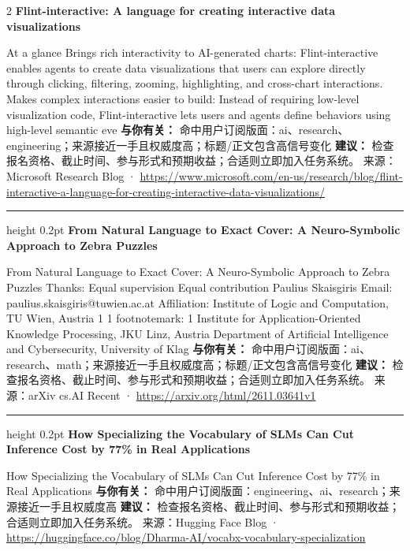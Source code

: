 \documentclass[10.5pt]{ctexart}
\begin{document}
\begin{multicols}{2}
{\large\bfseries Flint-interactive: A language for creating interactive data visualizations}\par
At a glance Brings rich interactivity to AI-generated charts: Flint-interactive enables agents to create data visualizations that users can explore directly through clicking, filtering, zooming, highlighting, and cross-chart interactions. Makes complex interactions easier to build: Instead of requiring low-level visualization code, Flint-interactive lets users and agents define behaviors using high-level semantic eve
\textbf{与你有关：} 命中用户订阅版面：ai、research、engineering；来源接近一手且权威度高；标题/正文包含高信号变化
\textbf{建议：} 检查报名资格、截止时间、参与形式和预期收益；合适则立即加入任务系统。
{\footnotesize\color{ormuted} 来源：Microsoft Research Blog · \url{https://www.microsoft.com/en-us/research/blog/flint-interactive-a-language-for-creating-interactive-data-visualizations/}}
\vspace{2mm}
\hrule height 0.2pt
\vspace{2mm}
{\large\bfseries From Natural Language to Exact Cover: A Neuro-Symbolic Approach to Zebra Puzzles}\par
From Natural Language to Exact Cover: A Neuro-Symbolic Approach to Zebra Puzzles Thanks: Equal supervision Equal contribution Paulius Skaisgiris Email: paulius.skaisgiris@tuwien.ac.at Affiliation: Institute of Logic and Computation, TU Wien, Austria 1 1 footnotemark: 1 Institute for Application-Oriented Knowledge Processing, JKU Linz, Austria Department of Artificial Intelligence and Cybersecurity, University of Klag
\textbf{与你有关：} 命中用户订阅版面：ai、research、math；来源接近一手且权威度高；标题/正文包含高信号变化
\textbf{建议：} 检查报名资格、截止时间、参与形式和预期收益；合适则立即加入任务系统。
{\footnotesize\color{ormuted} 来源：arXiv cs.AI Recent · \url{https://arxiv.org/html/2611.03641v1}}
\vspace{2mm}
\hrule height 0.2pt
\vspace{2mm}
{\large\bfseries How Specializing the Vocabulary of SLMs Can Cut Inference Cost by 77\% in Real Applications}\par
How Specializing the Vocabulary of SLMs Can Cut Inference Cost by 77\% in Real Applications
\textbf{与你有关：} 命中用户订阅版面：engineering、ai、research；来源接近一手且权威度高
\textbf{建议：} 检查报名资格、截止时间、参与形式和预期收益；合适则立即加入任务系统。
{\footnotesize\color{ormuted} 来源：Hugging Face Blog · \url{https://huggingface.co/blog/Dharma-AI/vocabx-vocabulary-specialization}}

\end{multicols}
\end{document}
